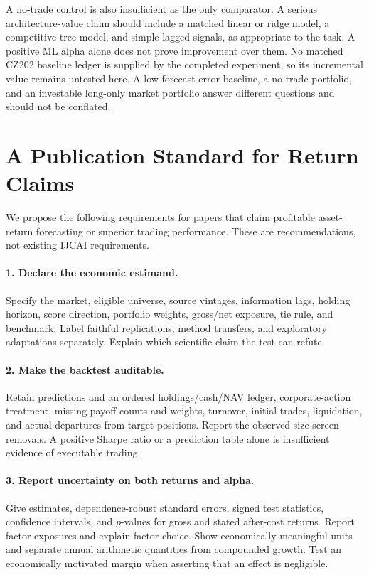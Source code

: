 \documentclass{article}
\begin{document}
A no-trade control is also insufficient as the only comparator. A serious architecture-value claim should include a matched linear or ridge model, a competitive tree model, and simple lagged signals, as appropriate to the task. A positive ML alpha alone does not prove improvement over them. No matched CZ202 baseline ledger is supplied by the completed experiment, so its incremental value remains untested here. A low forecast-error baseline, a no-trade portfolio, and an investable long-only market portfolio answer different questions and should not be conflated.

\section{A Publication Standard for Return Claims}
We propose the following requirements for papers that claim profitable asset-return forecasting or superior trading performance. These are recommendations, not existing IJCAI requirements.

\paragraph{1. Declare the economic estimand.}
Specify the market, eligible universe, source vintages, information lags, holding horizon, score direction, portfolio weights, gross/net exposure, tie rule, and benchmark. Label faithful replications, method transfers, and exploratory adaptations separately. Explain which scientific claim the test can refute.

\paragraph{2. Make the backtest auditable.}
Retain predictions and an ordered holdings/cash/NAV ledger, corporate-action treatment, missing-payoff counts and weights, turnover, initial trades, liquidation, and actual departures from target positions. Report the observed size-screen removals. A positive Sharpe ratio or a prediction table alone is insufficient evidence of executable trading.

\paragraph{3. Report uncertainty on both returns and alpha.}
Give estimates, dependence-robust standard errors, signed test statistics, confidence intervals, and $p$-values for gross and stated after-cost returns. Report factor exposures and explain factor choice. Show economically meaningful units and separate annual arithmetic quantities from compounded growth. Test an economically motivated margin when asserting that an effect is negligible.
\end{document}
